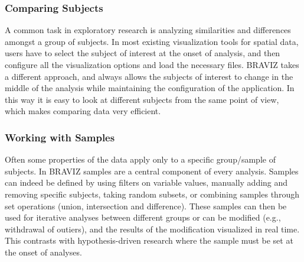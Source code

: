 \documentclass{frontiersHLTH}
\begin{document}

\subsubsection{Comparing Subjects}

A common task in exploratory research is analyzing similarities and differences amongst a group of subjects. In most existing visualization tools for spatial data, users have to select the subject of interest at the onset of analysis, and then configure all the visualization options and load the necessary files. BRAVIZ takes a different approach, and always allows the subjects of interest to change in the middle of the analysis while maintaining the configuration of the application. In this way it is easy to look at different subjects from the same point of view, which makes comparing data very efficient.  

\subsubsection{Working with Samples}
\label{subsamples}
Often some properties of the data apply only to a specific group/sample of subjects. In BRAVIZ samples are a central component of every analysis. Samples can indeed be defined by using filters on variable values, manually adding and removing specific subjects, taking random subsets, or combining samples through set operations (union, intersection and difference). 
These samples can then be used for iterative analyses between different groups or can be modified (e.g., withdrawal of outiers), and the results of the modification visualized in real time. This contrasts with hypothesis-driven research where the sample must be set at the onset of analyses.


\end{document}
